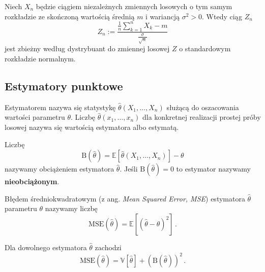 \documentclass{myclass}
\numberwithin{equation}{subsection}
\begin{document}
\begin{theorem}
Niech \(X_n\) będzie ciągiem niezależnych zmiennych losowych o tym samym rozkładzie ze skończoną
wartością średnią \(m\) i wariancją \(\sigma^2 > 0\). Wtedy ciąg \(Z_n\)
\begin{equation*}
    Z_n := \frac{\frac{1}{n}\sum_{k=1}^n X_k - m}{\frac{\sigma}{\sqrt{n}}}
\end{equation*}
jest zbieżny według dystrybuant do zmiennej losowej \(Z\) o standardowym rozkładzie normalnym.
\end{theorem}


\subsection{Estymatory punktowe}

\begin{definition}[Estymatora]
Estymatorem nazywa się statystykę \(\hat{\theta}(X_1,\ldots,X_n)\) służącą do oszacowania wartości
parametru \(\theta\). Liczbę \(\hat{\theta}(x_1,\ldots,x_n)\) dla konkretnej realizacji prostej
próby losowej nazywa się wartością estymatora albo estymatą.
\end{definition}

\begin{definition}
Liczbę
\begin{equation*}
    \mathrm{B}(\hat{\theta}) = \mathbb{E}[\hat{\theta}(X_1,\ldots,X_n)] - \theta
\end{equation*}
nazywamy obciążeniem estymatora \(\hat\theta\). Jeśli \(\mathrm{B}(\hat{\theta}) = 0\) to estymator
nazywamy \textbf{nieobciążonym}.
\end{definition}

\begin{definition}
Błędem średniokwadratowym (z ang. \textit{Mean Squared Error, MSE}) estymatora \(\hat{\theta}\)
parametru \(\theta\) nazywamy liczbę
\begin{equation*}
    \mathrm{MSE}(\hat{\theta}) = \mathbb{E}[(\hat{\theta} - \theta)^2]\,.
\end{equation*}
\end{definition}

\begin{theorem}
Dla dowolnego estymatora \(\hat{\theta}\) zachodzi
\begin{equation*}
    \mathrm{MSE}(\hat{\theta}) = \mathbb{V}[\hat{\theta}] + (\mathrm{B}(\hat{\theta}))^2\,.
\end{equation*}
\end{theorem}
\end{document}
